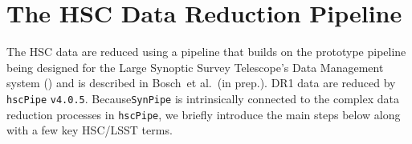 \documentclass[useamsfonts]{pasj01}
\def\etal{{\ et al.~}}
\def\hscpipe{\texttt{hscPipe}}
\def\synpipe{\texttt{SynPipe}}
\begin{document}

\section{The HSC Data Reduction Pipeline}
    \label{ssec:hscpipe}

    The HSC data are reduced using a pipeline that builds on the prototype pipeline 
    being designed for the Large Synoptic Survey Telescope’s Data Management system
    (\citealt{Ivezic2008, Axelrod2010, Juric2015}) and is described in 
    Bosch\etal (in prep.). 
    DR1 data are reduced by \hscpipe{} \texttt{v4.0.5}. 
    Because\synpipe{} is intrinsically connected to the complex data reduction
    processes in \hscpipe{}, we briefly introduce the main steps below along with a 
    few key HSC/LSST terms.
\end{document}
